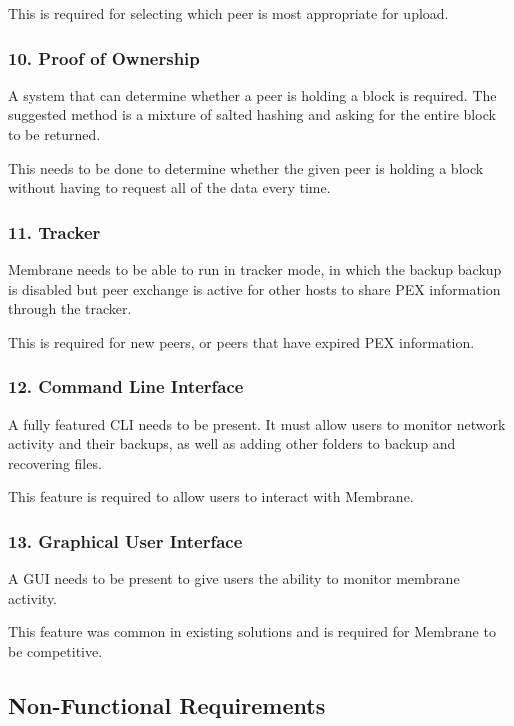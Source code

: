 \documentclass[11pt, a4paper, twocolumn, twoside]{report}
\begin{document}
This is required for selecting which peer is most appropriate for upload.

\subsubsection{10. Proof of Ownership}

A system that can determine whether a peer is holding a block is required. The suggested method is a mixture of salted hashing and asking for the entire block to be returned. 

This needs to be done to determine whether the given peer is holding a block without having to request all of the data every time.

\subsubsection{11. Tracker}

Membrane needs to be able to run in tracker mode, in which the backup backup is disabled but peer exchange is active for other hosts to share PEX information through the tracker.

This is required for new peers, or peers that have expired PEX information.

\subsubsection{12. Command Line Interface}

A fully featured CLI needs to be present. It must allow users to monitor network activity and their backups, as well as adding other folders to backup and recovering files.

This feature is required to allow users to interact with Membrane.

\subsubsection{13. Graphical User Interface} \label{sec:gui-req}

A GUI needs to be present to give users the ability to monitor membrane activity.

This feature was common in existing solutions and is required for Membrane to be competitive.

\subsection{Non-Functional Requirements}
\end{document}
